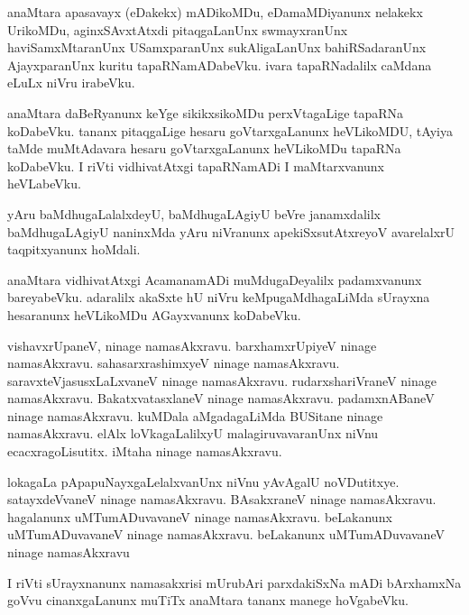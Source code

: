 \documentclass{article}
\begin{document}
\begin{mn}
anaMtara  apasavayx (eDakekx) mADikoMDu,  eDamaMDiyanunx  nelakekx  UrikoMDu,  
aginxSAvxtAtxdi  pitaqgaLanUnx  swmayxranUnx  haviSamxMtaranUnx  USamxparanUnx  
sukAligaLanUnx  bahiRSadaranUnx  AjayxparanUnx  kuritu  tapaRNamADabeVku.  
ivara  tapaRNadalilx  caMdana  eLuLx  niVru  irabeVku.
\end{mn}

\begin{mn}
anaMtara  daBeRyanunx  keYge  sikikxsikoMDu  perxVtagaLige  tapaRNa  koDabeVku.  
tananx  pitaqgaLige  hesaru  goVtarxgaLanunx  heVLikoMDU,  tAyiya  taMde  
muMtAdavara  hesaru  goVtarxgaLanunx heVLikoMDu  tapaRNa  koDabeVku.  I riVti  
vidhivatAtxgi  tapaRNamADi  I  maMtarxvanunx  heVLabeVku.
\end{mn}

\begin{mn}
yAru  baMdhugaLalalxdeyU,  baMdhugaLAgiyU  beVre  janamxdalilx   baMdhugaLAgiyU  
naninxMda  yAru  niVranunx  apekiSxsutAtxreyoV  avarelalxrU  taqpitxyanunx  hoMdali.
\end{mn}

\begin{mn}
anaMtara  vidhivatAtxgi  AcamanamADi  muMdugaDeyalilx  padamxvanunx  bareyabeVku.  adaralilx  
akaSxte  hU  niVru  keMpugaMdhagaLiMda  sUrayxna  hesaranunx  heVLikoMDu  AGayxvanunx  koDabeVku.
\end{mn}

\begin{mn}
vishavxrUpaneV,  ninage  namasAkxravu.  barxhamxrUpiyeV  ninage  namasAkxravu.  
sahasarxrashimxyeV  ninage  namasAkxravu.  saravxteVjasusxLaLxvaneV  ninage  
namasAkxravu.  rudarxshariVraneV  ninage  namasAkxravu.  BakatxvatasxlaneV  ninage  
namasAkxravu.  padamxnABaneV  ninage  namasAkxravu.  kuMDala  aMgadagaLiMda  
BUSitane  ninage  namasAkxravu.  elAlx  loVkagaLalilxyU  malagiruvavaranUnx  
niVnu  ecacxragoLisutitx.  iMtaha  ninage  namasAkxravu.
\end{mn}

\begin{mn}
lokagaLa  pApapuNayxgaLelalxvanUnx  niVnu  yAvAgalU  noVDutitxye.  satayxdeVvaneV  
ninage  namasAkxravu.  BAsakxraneV  ninage  namasAkxravu. hagalanunx  uMTumADuvavaneV  
ninage  namasAkxravu.  beLakanunx  uMTumADuvavaneV  ninage  namasAkxravu.  beLakanunx  
uMTumADuvavaneV  ninage  namasAkxravu
\end{mn}

\begin{mn}
I riVti  sUrayxnanunx  namasakxrisi  mUrubAri  parxdakiSxNa mADi  bArxhamxNa  
goVvu  cinanxgaLanunx  muTiTx  anaMtara  tananx  manege  hoVgabeVku.
\end{mn}
\end{document}
